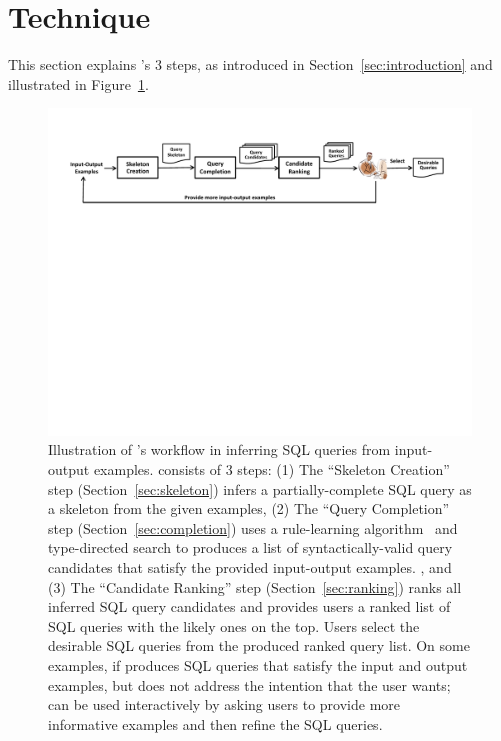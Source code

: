
\section{Technique}
\label{sec:approach}

This section explains \ourtool's 3 steps, as introduced
in Section~\ref{sec:introduction} and illustrated
in Figure~\ref{fig:workflow}.



\begin{figure}[t]
  \centering
  \includegraphics[scale=0.70]{workflow}
  \vspace*{-1.0ex}\caption {{\label{fig:workflow} Illustration
  of \ourtool's workflow in inferring SQL queries from input-output examples. \ourtool consists of 3 steps: (1) The ``Skeleton Creation'' step (Section~\ref{sec:skeleton})
infers a partially-complete SQL query as a skeleton from the given
examples, (2) The ``Query Completion'' step (Section~\ref{sec:completion}) uses
a rule-learning algorithm~\cite{} and type-directed search to
produces a list of syntactically-valid query candidates that satisfy
the provided input-output examples.
, and (3) The ``Candidate Ranking'' step (Section~\ref{sec:ranking})
ranks all inferred SQL query candidates and provides users a
ranked list of SQL queries with the likely ones on the top. 
Users select the
desirable SQL queries from the produced ranked query list. On some
examples, if \ourtool produces SQL queries that satisfy the input and
output examples, but does not address the intention that the user wants;
\ourtool can be used interactively by asking users to provide more
informative examples and then refine the SQL queries.
}}

\end{figure}


